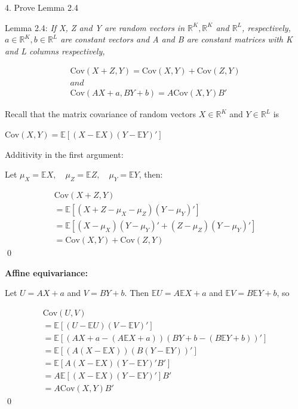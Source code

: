 \documentclass[10pt]{article}
\begin{document}
\newpage

4. Prove Lemma 2.4

Lemma 2.4: \textit{If X, Z and Y are random vectors in $\mathbb{R}^K, \mathbb{R}^K$ and $\mathbb{R}^L$, respectively, $a \in \mathbb{R}^K, b \in \mathbb{R}^L$ are constant vectors and A and B are constant matrices with K and L columns respectively,}

\begin{gather*}
    \text{Cov}(X + Z, Y) = \text{Cov}(X, Y) + \text{Cov}(Z, Y)\\
    \textit{and}\\
    \text{Cov}(AX + a, BY + b) = A\text{Cov}(X, Y)B'
\end{gather*}

Recall that the matrix covariance of random vectors $X \in \mathbb{R}^K$ and $Y \in \mathbb{R}^L$ is 

Cov$(X, Y) = \mathbb{E}[(X - \mathbb{E}X)(Y - \mathbb{E}Y)']$

Additivity in the first argument:

Let $\mu_X = \mathbb{E}X, \quad\mu_Z = \mathbb{E}Z, \quad\mu_Y = \mathbb{E}Y$, then:

\begin{gather*}
    \text{Cov}(X + Z, Y) \\
    = \mathbb{E}[(X + Z - \mu_X - \mu_Z)(Y - \mu_Y)']\\
    = \mathbb{E}[(X - \mu_X)(Y - \mu_Y)' + (Z - \mu_Z)(Y - \mu_Y)'] \\
    = \text{Cov}(X, Y) + \text{Cov}(Z, Y)
\end{gather*}
\qed

\textbf{Affine equivariance: }

Let $U = AX + a$ and $V = BY + b$. Then $\mathbb{E}U = A \mathbb{E}X+ a$ and $\mathbb{E}V = B \mathbb{E}Y + b$, so 

\begin{gather*}
    \text{Cov}(U, V) \\
    = \mathbb{E}[(U - \mathbb{E}U)(V - \mathbb{E}V)']\\
    = \mathbb{E}[(AX + a - (A\mathbb{E}X + a))(BY + b - (B\mathbb{E}Y + b))']\\
    = \mathbb{E}[(A(X - \mathbb{E}X))(B(Y - \mathbb{E}Y))']\\
    = \mathbb{E}[A(X - \mathbb{E}X)(Y - \mathbb{E}Y)'B']\\
    = A\mathbb{E}[(X - \mathbb{E}X)(Y - \mathbb{E}Y)']B'\\
    = A\text{Cov}(X, Y)B'
\end{gather*}
\qed
\end{document}

